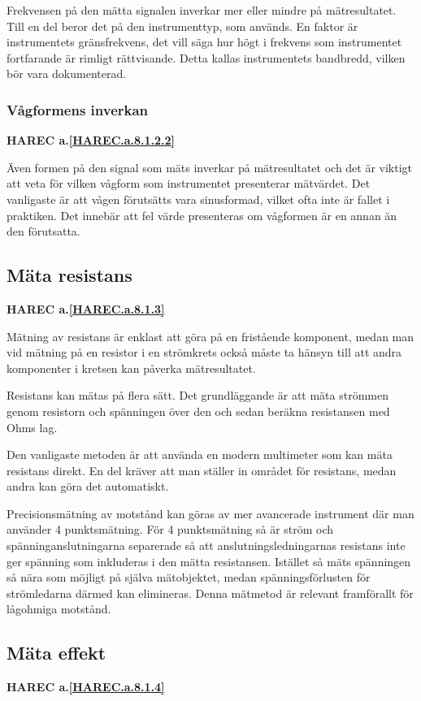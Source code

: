 Frekvensen på den mätta signalen inverkar mer eller mindre på mätresultatet.
Till en del beror det på den instrumenttyp, som används.
En faktor är instrumentets gränsfrekvens, det vill säga hur högt i frekvens som
instrumentet fortfarande är rimligt rättvisande.
Detta kallas instrumentets bandbredd, vilken bör vara dokumenterad.

\subsubsection{Vågformens inverkan}
\textbf{
HAREC a.\ref{HAREC.a.8.1.2.2}\label{myHAREC.a.8.1.2.2}
}

Även formen på den signal som mäts inverkar på mätresultatet och det
är viktigt att veta för vilken vågform som instrumentet presenterar mätvärdet.
Det vanligaste är att vågen förutsätts vara sinusformad, vilket ofta inte är
fallet i praktiken.
Det innebär att fel värde presenteras om vågformen är en annan än den
förutsatta.

\subsection{Mäta resistans}
\textbf{
HAREC a.\ref{HAREC.a.8.1.3}\label{myHAREC.a.8.1.3}
}

Mätning av resistans är enklast att göra på en fristående komponent,
medan man vid mätning på en resistor i en strömkrets också måste ta
hänsyn till att andra komponenter i kretsen kan påverka mätresultatet.

Resistans kan mätas på flera sätt.
Det grundläggande är att mäta strömmen genom resistorn och spänningen över den
och sedan beräkna resistansen med Ohms lag.

Den vanligaste metoden är att använda en modern multimeter som kan mäta
resistans direkt.
En del kräver att man ställer in området för resistans, medan andra
kan göra det automatiskt.

Precisionsmätning av motstånd kan göras av mer avancerade instrument
där man använder 4 punktsmätning.
För 4 punktsmätning så är ström och spänninganslutningarna separerade
så att anslutningsledningarnas resistans inte ger spänning som inkluderas
i den mätta resistansen.
Istället så mäts spänningen så nära som möjligt på själva mätobjektet,
medan spänningsförlusten för strömledarna därmed kan elimineras.
Denna mätmetod är relevant framförallt för lågohmiga motstånd.

\subsection{Mäta effekt}
\textbf{
HAREC a.\ref{HAREC.a.8.1.4}\label{myHAREC.a.8.1.4}
}
\label{mätaeffekt}

